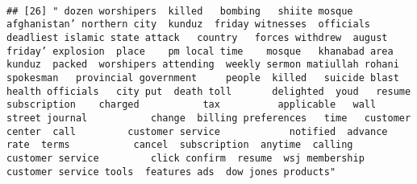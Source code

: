 \documentclass[
]{article}
\begin{document}
\begin{verbatim}
                                                                                                                                                                                                                                                                                                                                                                                                                                                                   
## [26] " dozen worshipers  killed   bombing   shiite mosque  afghanistan’ northern city  kunduz  friday witnesses  officials    deadliest islamic state attack   country   forces withdrew  august friday’ explosion  place    pm local time    mosque   khanabad area  kunduz  packed  worshipers attending  weekly sermon matiullah rohani  spokesman   provincial government     people  killed   suicide blast health officials   city put  death toll       delighted  youd   resume  subscription    charged           tax          applicable   wall street journal           change  billing preferences   time   customer center  call         customer service            notified  advance     rate  terms           cancel  subscription  anytime  calling         customer service         click confirm  resume  wsj membership customer service tools  features ads  dow jones products"                                                                                                                                                                                                                                                                                                                                                                                                                                                                                                                                                                                                                                                                                                                                                                                                                                                                                                                                                                                                                                                                                                                                                                                                                                                                                                                                                                                                                                                                                                                                                                                                                                                                                                                                                                                                                                                                                                                                                                                                                                                                           
\end{verbatim}
\end{document}
